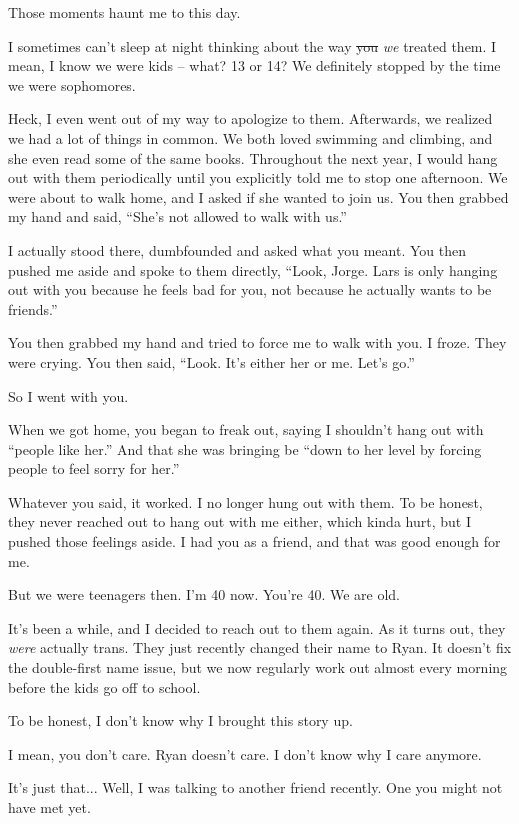 Those moments haunt me to this day.

I sometimes can't sleep at night thinking about the way \sout{you} \textit{we} treated them.
I mean, I know we were kids -- what? 13 or 14?
We definitely stopped by the time we were sophomores.

Heck, I even went out of my way to apologize to them.
Afterwards, we realized we had a lot of things in common.
We both loved swimming and climbing, and she even read some of the same books.
Throughout the next year, I would hang out with them periodically until you explicitly told me to stop one afternoon.
We were about to walk home, and I asked if she wanted to join us.
You then grabbed my hand and said, ``She's not allowed to walk with us.''

I actually stood there, dumbfounded and asked what you meant. You then pushed me aside and spoke to them directly, ``Look, Jorge. Lars is only hanging out with you because he feels bad for you, not because he actually wants to be friends.''

You then grabbed my hand and tried to force me to walk with you.
I froze.
They were crying.
You then said, ``Look. It's either her or me. Let's go.''

So I went with you.

When we got home, you began to freak out, saying I shouldn't hang out with ``people like her.'' And that she was bringing be ``down to her level by forcing people to feel sorry for her.''

Whatever you said, it worked.
I no longer hung out with them.
To be honest, they never reached out to hang out with me either, which kinda hurt, but I pushed those feelings aside.
I had you as a friend, and that was good enough for me.

But we were teenagers then.
I'm 40 now.
You're 40.
We are old.

It's been a while, and I decided to reach out to them again.
As it turns out, they \textit{were} actually trans.
They just recently changed their name to Ryan.
It doesn't fix the double-first name issue, but we now regularly work out almost every morning before the kids go off to school.

To be honest, I don't know why I brought this story up.

I mean, you don't care.
Ryan doesn't care.
I don't know why I care anymore.

It's just that...
Well, I was talking to another friend recently.
One you might not have met yet.

